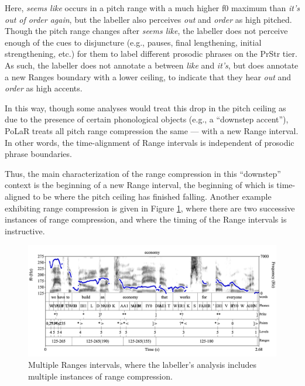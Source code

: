 \documentclass[11pt, twoside]{memoir}
\def\textlabel#1{{\relsize{-.5}\fontspec[Mapping=tex-text]{Roboto Mono}{#1}}}
\def\langtext#1{\textit{#1}}
\begin{document}
Here, \langtext{seems like} occurs in a pitch range with a much higher f0 maximum than \langtext{it’s out of order again}, but the labeller also perceives \langtext{out} and \langtext{order} as high pitched. Though the pitch range changes after \langtext{seems like}, the labeller does not perceive enough of the cues to disjuncture (e.g., pauses, final lengthening, initial strengthening, etc.) for them to label different prosodic phrases on the PrStr tier. As such, the labeller does not annotate a \textlabel{]} between \langtext{like} and \langtext{it’s}, but does annotate a new Ranges boundary with a lower ceiling, to indicate that they hear \langtext{out} and \langtext{order} as high accents.

In this way, though some analyses would treat this drop in the pitch ceiling as due to the presence of certain phonological objects (e.g., a “downstep accent”), PoLaR treats all pitch range compression the same — with a new Range interval. In other words, the time-alignment of Range intervals is independent of prosodic phrase boundaries.

Thus, the main characterization of the range compression in this “downstep” context is the beginning of a new Range interval, the beginning of which is time-aligned to be where the pitch ceiling has finished falling. Another example exhibiting range compression is given in Figure \ref{fig:economy Ranges Adv}, where there are two successive instances of range compression, and where the timing of the Range intervals is instructive.

\begin{figure}[H]
\centering
%
\includegraphics[width=.875\linewidth]{Ranges-economy-advanced.png}
%
\caption{Multiple Ranges intervals, where the labeller’s analysis includes multiple instances of range compression.%
\label{fig:economy Ranges Adv}%
}
\end{figure}
\end{document}
